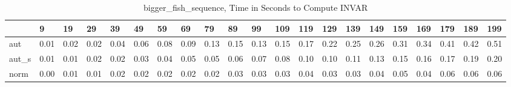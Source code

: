 \begin{table}
\caption{bigger_fish_sequence, Time in Seconds to Compute INVAR}
\label{bigger_fish_sequence_INVAR_time}
\begin{tabular}{lllllllllllllllllllll}
\toprule
 & 9 & 19 & 29 & 39 & 49 & 59 & 69 & 79 & 89 & 99 & 109 & 119 & 129 & 139 & 149 & 159 & 169 & 179 & 189 & 199 \\
\midrule
aut & 0.01 & 0.02 & 0.02 & 0.04 & 0.06 & 0.08 & 0.09 & 0.13 & 0.15 & 0.13 & 0.15 & 0.17 & 0.22 & 0.25 & 0.26 & 0.31 & 0.34 & 0.41 & 0.42 & 0.51 \\
aut_s & 0.01 & 0.01 & 0.02 & 0.02 & 0.03 & 0.04 & 0.05 & 0.05 & 0.06 & 0.07 & 0.08 & 0.10 & 0.10 & 0.11 & 0.13 & 0.15 & 0.16 & 0.17 & 0.19 & 0.20 \\
norm & 0.00 & 0.01 & 0.01 & 0.02 & 0.02 & 0.02 & 0.02 & 0.02 & 0.03 & 0.03 & 0.03 & 0.04 & 0.03 & 0.03 & 0.04 & 0.05 & 0.04 & 0.06 & 0.06 & 0.06 \\
\bottomrule
\end{tabular}
\end{table}
